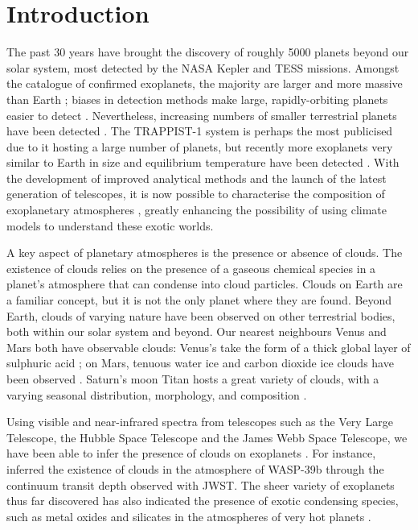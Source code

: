 \section{Introduction}\label{sec:intro}



The past 30 years have brought the discovery of roughly 5000 planets beyond our solar system, most detected by the NASA Kepler \citep{borucki2011-Characteristics} and TESS \citep{dragomir2019-TESS, cacciapuoti2022-TESS} missions. Amongst the catalogue of confirmed exoplanets, the majority are larger and more massive than Earth \citep{nasaexoplanetscienceinstitute2020-Planetary}; biases in  detection methods make large, rapidly-orbiting planets easier to detect \citep{burrows2014-Highlights}. Nevertheless, increasing numbers of smaller terrestrial planets have been detected \citep{bryson2020-Occurrence}. The TRAPPIST-1 system \citep{gillon2017-Seven} is perhaps the most publicised due to it hosting a large number of planets, but recently more exoplanets very similar to Earth in size and equilibrium temperature have been detected \citep{gilbert2020-First}. With the development of improved analytical methods and the launch of the latest generation of telescopes, it is now possible to characterise the composition of exoplanetary atmospheres \citep[e.g.,][]{alderson2022-Early}, greatly enhancing the possibility of using climate models to understand these exotic worlds.



A key aspect of planetary atmospheres is the presence or absence of clouds. The existence of clouds relies on the presence of a gaseous chemical species in a planet's atmosphere that can condense into cloud particles. Clouds on Earth are a familiar concept, but it is not the only planet where they are found. Beyond Earth, clouds of varying nature have been observed on other terrestrial bodies, both within our solar system and beyond. Our nearest neighbours Venus and Mars both have observable clouds: Venus's take the form of a thick global layer of sulphuric acid \citep{krasnopolsky1981-Chemical}; on Mars, tenuous water ice and carbon dioxide ice clouds have been observed \citep[e.g.,][and references therein]{curran1973-Mars, belliii1996-Detection, haberle2017-Atmosphere}. Saturn's moon Titan hosts a great variety of clouds, with a varying seasonal distribution, morphology, and composition \citep[e.g.,][]{griffith2006-Titan, dekok2014-HCN, turtle2018-Titan}.

Using visible and near-infrared spectra from telescopes such as the Very Large Telescope, the Hubble Space Telescope and the James Webb Space Telescope, we have been able to infer the presence of clouds on exoplanets \citep{kreidberg2014-Clouds, sing2016-Continuum, samland2017-Spectral, barstow2021-Curse}. For instance, \citet{alderson2022-Early} inferred the existence of clouds in the atmosphere of WASP-39b through the continuum transit depth observed with JWST. The sheer variety of exoplanets thus far discovered has also indicated the presence of exotic condensing species, such as metal oxides and silicates in the atmospheres of very hot planets \citep[e.g.,][]{helling2019-Exoplanet}.





